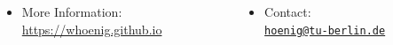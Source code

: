 \documentclass[aspectratio=169,xcolor={svgnames}]{beamer}
\begin{document}
  \begin{frame}[standout]
    \inserttitle

    \begin{center}
    \end{center}

    \begin{columns}
      \begin{column}{0.55\textwidth}
        \begin{itemize}
        \item More Information:\\\url{https://whoenig.github.io}
        \end{itemize}
      \end{column}
      \begin{column}{0.45\textwidth}
        \begin{itemize}
        \item Contact:\\\href{mailto:hoenig@tu-berlin.de}{\texttt{hoenig@tu-berlin.de}}%
        \end{itemize}
      \end{column}
    \end{columns}
  \end{frame}
\end{document}
